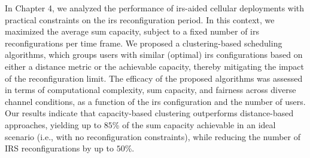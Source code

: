 In Chapter 4, we analyzed the performance of \gls{irs}-aided cellular deployments with practical constraints on the \gls{irs} reconfiguration period. In this context, we maximized the average sum capacity, subject to a fixed number of \gls{irs} reconfigurations per time frame. We proposed a clustering-based scheduling algorithms, which groups users with similar (optimal) \gls{irs} configurations based on either a distance metric or the achievable capacity, thereby mitigating the impact of the reconfiguration limit.
The efficacy of the proposed algorithms was assessed in terms of computational complexity, sum capacity, and fairness across diverse channel conditions, as a function of the \gls{irs} configuration and the number of users.
Our results indicate that capacity-based clustering outperforms distance-based approaches, yielding up to $85$\% of the sum capacity achievable in an ideal scenario (i.e., with no reconfiguration constraints), while reducing the number of IRS reconfigurations by up to $50$\%.
